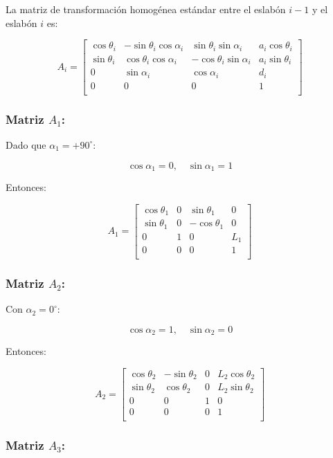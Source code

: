 \documentclass[10pt]{article}
\theoremstyle{definition}
\theoremstyle{remark}
\theoremstyle{definition}
\numberwithin{equation}{prob}
\begin{document}
La matriz de transformación homogénea estándar entre el eslabón \( i-1 \) y el eslabón \( i \) es:

\[
A_i = \begin{bmatrix}
\cos\theta_i & -\sin\theta_i \cos\alpha_i & \sin\theta_i \sin\alpha_i & a_i \cos\theta_i \\
\sin\theta_i & \cos\theta_i \cos\alpha_i & -\cos\theta_i \sin\alpha_i & a_i \sin\theta_i \\
0 & \sin\alpha_i & \cos\alpha_i & d_i \\
0 & 0 & 0 & 1 \\
\end{bmatrix}
\]

\subsubsection{\texorpdfstring{Matriz $A_1$:}{Matriz A1:}}

Dado que \( \alpha_1 = +90^\circ \):

\[
\cos\alpha_1 = 0, \quad \sin\alpha_1 = 1
\]

Entonces:

\[
A_1 = \begin{bmatrix}
\cos\theta_1 & 0 & \sin\theta_1 & 0 \\
\sin\theta_1 & 0 & -\cos\theta_1 & 0 \\
0 & 1 & 0 & L_1 \\
0 & 0 & 0 & 1 \\
\end{bmatrix}
\]

\subsubsection{\texorpdfstring{Matriz $A_2$:}{Matriz A2:}}

Con \( \alpha_2 = 0^\circ \):

\[
\cos\alpha_2 = 1, \quad \sin\alpha_2 = 0
\]

Entonces:

\[
A_2 = \begin{bmatrix}
\cos\theta_2 & -\sin\theta_2 & 0 & L_2 \cos\theta_2 \\
\sin\theta_2 & \cos\theta_2 & 0 & L_2 \sin\theta_2 \\
0 & 0 & 1 & 0 \\
0 & 0 & 0 & 1 \\
\end{bmatrix}
\]

\subsubsection{\texorpdfstring{Matriz \(A_3\):}{Matriz A3:}}
\end{document}
